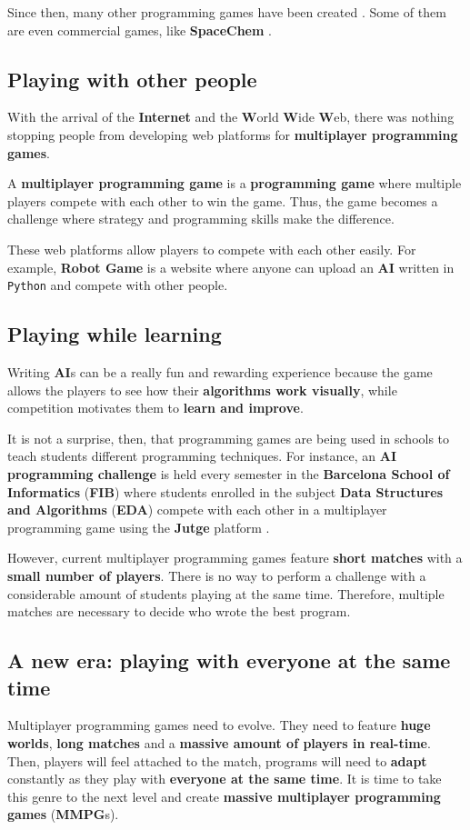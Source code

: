 \documentclass[a4paper,11pt]{article}
\begin{document}
Since then, many other programming games have been created \cite{pg}. Some of them are even commercial games, like
\textbf{SpaceChem} \cite{spacechem}.
\subsection{Playing with other people}
With the arrival of the \textbf{Internet} and the \textbf{W}orld \textbf{W}ide \textbf{W}eb, there was nothing stopping people from
developing web platforms for \textbf{multiplayer programming games}.

A \textbf{multiplayer programming game} is a \textbf{programming game} where multiple players compete with each other to win the
game. Thus, the game becomes a challenge where strategy and programming skills make the difference.

These web platforms allow players to compete with each other easily. For example, \textbf{Robot Game}
\cite{robotgame} is a website where anyone can upload an \textbf{AI} written in \texttt{Python} and compete with other people.
\subsection{Playing while learning}
Writing \textbf{AI}s can be a really fun and rewarding experience because the game allows the players to see how their
\textbf{algorithms work visually}, while competition motivates them to \textbf{learn and improve}.

It is not a surprise, then, that programming games are being used in schools to teach students different programming
techniques. For instance, an \textbf{AI programming challenge} is held every semester in the \textbf{Barcelona School of
Informatics} (\textbf{FIB}) where students enrolled in the subject \textbf{Data Structures and Algorithms} (\textbf{EDA}) \cite{eda}
compete with each other in a multiplayer programming game using the \textbf{Jutge} platform \cite{jutge}.

However, current multiplayer programming games feature \textbf{short matches} with a \textbf{small number of players}. There
is no way to perform a challenge with a considerable amount of students playing at the same time. Therefore, multiple
matches are necessary to decide who wrote the best program.
\subsection{A new era: playing with everyone at the same time}
Multiplayer programming games need to evolve. They need to feature \textbf{huge worlds}, \textbf{long matches} and
a \textbf{massive amount of players in real-time}. Then, players will feel attached to the match, programs will need to
\textbf{adapt} constantly as they play with \textbf{everyone at the same time}. It is time to take this genre to the next level and
create \textbf{massive multiplayer programming games} (\textbf{MMPG}s).
\clearpage
\end{document}
